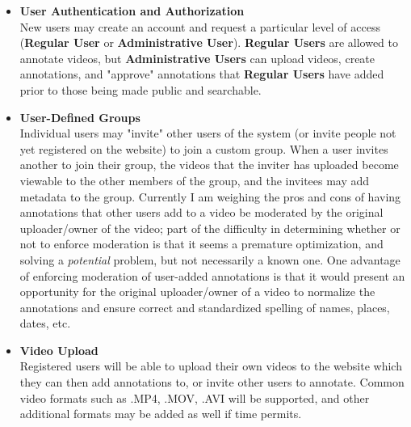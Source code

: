 \begin{itemize}[leftmargin=*]
\item \textbf{User Authentication and Authorization} \\
	New users may create an account and request a particular level of access (\textbf{Regular User} or \textbf{Administrative User}).  \textbf{Regular Users} are allowed to annotate videos, but \textbf{Administrative Users} can upload videos, create annotations, and "approve" annotations that \textbf{Regular Users} have added prior to those being made public and searchable.

\item \textbf{User-Defined Groups} \\
	Individual users may "invite" other users of the system (or invite people not yet registered on the website) to join a custom group.  When a user invites another to join their group, the videos that the inviter has uploaded become viewable to the other members of the group, and the invitees may add metadata to the group.  Currently I am weighing the pros and cons of having annotations that other users add to a video be moderated by the original uploader/owner of the video; part of the difficulty in determining whether or not to enforce moderation is that it seems a premature optimization, and solving a \textit{potential} problem, but not necessarily a known one. One advantage of enforcing moderation of user-added annotations is that it would present an opportunity for the original uploader/owner of a video to normalize the annotations and ensure correct and standardized spelling of names, places, dates, etc.

\item \textbf{Video Upload} \\
	Registered users will be able to upload their own videos to the website which they can then add annotations to, or invite other users to annotate.  Common video formats such as .MP4, .MOV, .AVI will be supported, and other additional formats may be added as well if time permits.


\end{itemize}
